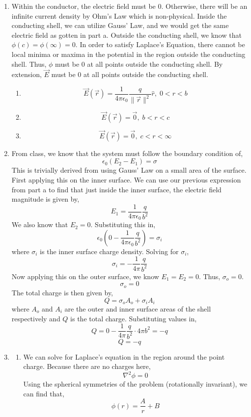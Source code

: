 \documentclass[12pt]{article}
\begin{document}
\begin{enumerate}
\begin{enumerate}
		\item [d.]
		Within the conductor, the electric field must be 0.
		Otherwise, there will be an infinite current density by Ohm's Law which is non-physical.
		Inside the conducting shell, we can utilize Gauss' Law, and we would get the same electric field as gotten in part a.
		Outside the conducting shell, we know that $\phi(c)=\phi(\infty)=0$.
		In order to satisfy Laplace's Equation, there cannot be local minima or maxima in the potential in the region outside the conducting shell.
		Thus, $\phi$ must be $0$ at all points outside the conducting shell.
		By extension, $\vec E$ must be 0 at all points outside the conducting shell.
		\begin{enumerate}
			\item [i.]
			\[\boxed{\vec E(\vec r)=\frac{1}{4\pi\epsilon_0}\frac{q}{\|\vec r\|^2}\hat r, \; 0 < r < b}\]

			\item [ii.]
			\[\boxed{\vec E(\vec r)=\vec 0, \; b < r < c}\]

			\item [iii.]
			\[\boxed{\vec E(\vec r)=\vec 0, \; c < r < \infty}\]
		\end{enumerate}

		\item [e.]
		From class, we know that the system must follow the boundary condition of, 
		\[\epsilon_0(E_2-E_1)=\sigma\]
		This is trivially derived from using Gauss' Law on a small area of the surface.
		First applying this on the inner surface.
		We can use our previous expression from part a to find that just inside the inner surface, the electric field magnitude is given by,
		\[E_1 = \frac{1}{4\pi \epsilon_0}\frac{q}{b^2}\]
		We also know that $E_2=0$.
		Substituting this in,
		\[\epsilon_0\left(0 - \frac{1}{4\pi\epsilon_0}\frac{q}{b^2}\right)=\sigma_i\]
		where $\sigma_i$ is the inner surface charge density.
		Solving for $\sigma_i$,
		\[\boxed{\sigma_i = -\frac{1}{4\pi}\frac{q}{b^2}}\]
		Now applying this on the outer surface, we know $E_1=E_2=0$.
		Thus, $\sigma_o=0$.
		\[\boxed{\sigma_o =0}\]
		The total charge is then given by,
		\[Q=\sigma_oA_o+\sigma_iA_i\]
		where $A_o$ and $A_i$ are the outer and inner surface areas of the shell respectively and $Q$ is the total charge.
		Substituting values in,
		\[Q=0-\frac{1}{4\pi}\frac{q}{b^2}\cdot 4\pi b^2=-q\]
		\[\boxed{Q=-q}\]

		\item [f.]
		\begin{enumerate}
			\item [i.]
			We can solve for Laplace's equation in the region around the point charge.
			Because there are no charges here,
			\[\nabla^2\phi = 0\]
			Using the spherical symmetries of the problem (rotationally invariant), we can find that,
			\[\phi(r)=\frac{A}{r}+B\]


\end{enumerate}
\end{enumerate}
\end{enumerate}
\end{document}
